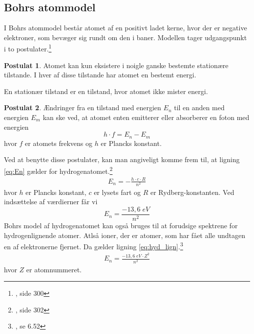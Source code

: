 \documentclass[11pt]{article}
\theoremstyle{definition}
\newtheorem{postu}{Postulat}
\begin{document}
\subsection{Bohrs atommodel}
I Bohrs atommodel består atomet af en positivt ladet kerne, hvor der er negative elektroner, som bevæger sig rundt om den i baner.
Modellen tager udgangspunkt i to postulater.\footnote{\cite{Brydensholt2021}, side 300}
\begin{postu}
 Atomet kan kun eksistere i noigle ganske bestemte stationære tilstande. I hver af disse tilstande har atomet en bestemt energi. 
\end{postu}
En stationær tilstand er en tilstand, hvor atomet ikke mister energi.
\begin{postu}
  Ændringer fra en tilstand med energien $E_n$ til en anden med energien $E_m$ kan ske ved, at atomet enten emitterer eller absorberer en foton med energien
  \[
  h\cdot f=E_n-E_m
  \] 
  hvor $f$ er atomets frekvens og $h$ er Plancks konstant. 
\end{postu}
Ved at benytte disse postulater, kan man angiveligt komme frem til, at ligning \ref{eq:En} gælder for hydrogenatomet.\footnote{\cite{Brydensholt2021}, side 302}
\begin{equation}
\label{eq:En}
\begin{split}
  E_n=-\frac{h\cdot c\cdot R}{n^2}
\end{split}
\end{equation}
hvor $h$ er Plancks konstant, $c$ er lysets fart og $R$ er Rydberg-konstanten. 
Ved indsættelse af værdierner får vi
\[
E_n=\frac{-13,6 \;\unit{eV} }{n^2}
\] 
Bohrs model af hydrogenatomet kan også bruges til at forudsige spektrene for hydrogenlignende atomer.
Atlså ioner, der er atomer, som har fået alle undtagen en af elektronerne fjernet.
Da gælder ligning \ref{eq:hyd_lign}.\footnote{\cite{RiceUniversity2023}, se 6.52}
\begin{equation}
\label{eq:hyd_lign}
\begin{split}
  E_n=\frac{-13,6 \;\unit{eV} \cdot Z^2}{n^2}
\end{split}
\end{equation}
hvor $Z$ er atomnummeret. 
\end{document}
